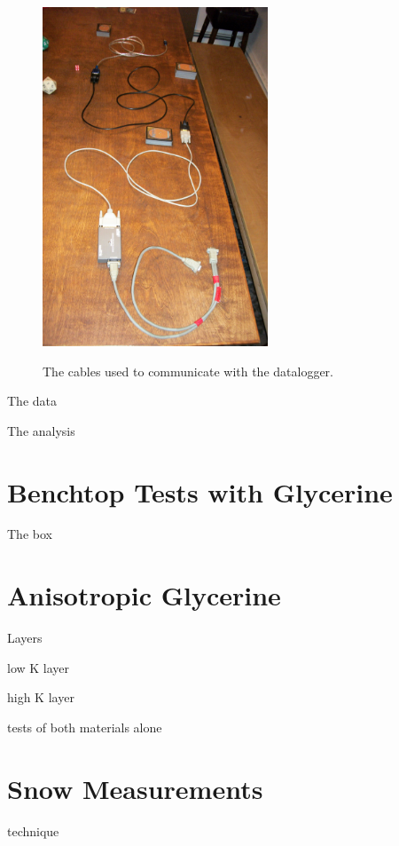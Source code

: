 \begin{figure}[h]
\centering
\includegraphics[width=0.6\textwidth]{fig/cable.jpg}
\label{fig:cable}
\caption{The cables used to communicate with the datalogger.}
\end{figure}

The data

The analysis

\section{Benchtop Tests with Glycerine}

The box

\section{Anisotropic Glycerine}

Layers

low K layer

high K layer

tests of both materials alone

\section{Snow Measurements}

technique
